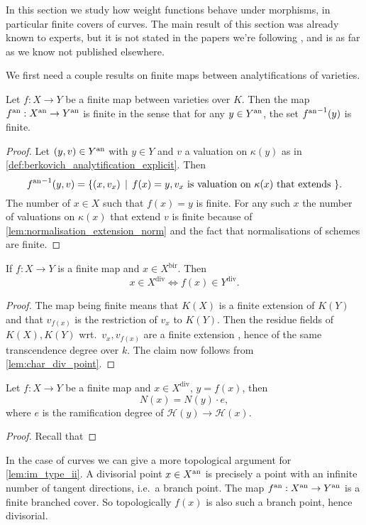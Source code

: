 In this section we study how weight functions behave under morphisms, in particular finite covers of curves. 
The main result of this section \label{prop:weightfunction_fullback} was already known to experts, but it is not stated in the papers we're following \cite{bakerWeightFunctionsBerkovich2016,nicaiseBerkovichSkeletaBirational2016,mustataWeightFunctionsNonArchimedean2015}, and is as far as we know not published elsewhere. 

We first need a couple results on finite maps between analytifications of varieties. 

\begin{lemma}
	Let $f: X \to Y$ be a finite map between varieties over  $K$. 
Then the map $f{}^{\text{an}}: X{}^{\text{an}} \to Y{}^{\text{an}}$ is finite in the sense that for any $y \in Y{}^{\text{an}}$, the set ${f{}^{\text{an}}}^{-1}(y)$ is finite. 
\end{lemma}
\begin{proof}
	Let $(y, v) \in Y{}^{\text{an}}$ with $y \in Y$ and $v$ a valuation on $\kappa(y)$ as in \cref{def:berkovich_analytification_explicit}. 
	Then \[
		{f\an}^{-1} (y, v) = \{(x, v_x) \st f(x) = y, v_x \text{ is valuation on $\kappa(x)$ that extends }  \} 
	.\]
	The number of $x \in X$ such that $f(x) = y$ is finite. 
	For any such $x$ the number of valuations on $\kappa(x)$ that extend $v$ is finite because of \cref{lem:normalisation_extension_norm} and the fact that normalisations of schemes are finite. 
\end{proof}

\begin{lemma}\label{lem:im_type_ii}
	If $f: X \to Y$ is a finite map and $x \in X^{\text{bir}}$. Then
	\[
		x \in X^\text{div} \iff f(x) \in Y^\text{div}
	.\] 
\end{lemma}
\begin{proof}
	The map being finite means that $K(X)$ is a finite extension of $K(Y)$ and that $v_{f(x)}$ is the restriction of $v_x$ to $K(Y)$. 
	Then the residue fields of $K(X), K(Y)$ wrt.\ $v_x, v_{f(x)}$ are a finite extension , hence of the same transcendence degree over $k$. 
	The claim now follows from \cref{lem:char_div_point}.
\end{proof}
\begin{lemma}
	Let $f: X \to Y$ be a finite map and $x \in X^{\text{div}}$, $y = f(x)$, 
	then \[
		N(x) = N(y)\cdot e
	,\]
	where $e$ is the ramification degree of $\mathcal{H} (y) \to \mathcal{H} (x)$. 
\end{lemma}
\begin{proof}
	Recall that 
\end{proof}
\begin{remark}
	In the case of curves we can give a more topological argument for \cref{lem:im_type_ii}. 
	A divisorial point $x \in X{}^{\text{an}}$ is precisely a point with an infinite number of tangent directions, i.e.\ a branch point.
	The map $f{}^{\text{an}}: X{}^{\text{an}} \to Y{}^{\text{an}} $ is a finite branched cover. So topologically $f(x)$ is also such a branch point, hence divisorial. 	
\end{remark}

